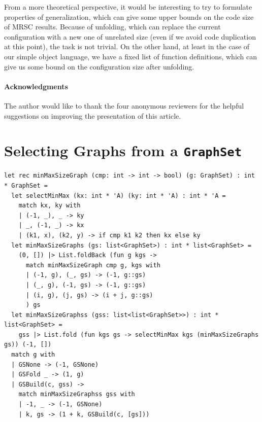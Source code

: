 \documentclass[submission,copyright,creativecommons]{eptcs}
\begin{document}
From a more theoretical perspective, it would be interesting to try to formulate properties
of generalization, which can give some upper bounds on the code size of MRSC results.
Because of unfolding, which can replace the current configuration with a new one of unrelated size (even
if we avoid code duplication at this point), the task is not trivial.
On the other hand, at least in the case of our simple object language, we have a fixed
list of function definitions, which can give us some bound on the configuration size
after unfolding.

\paragraph{Acknowledgments}
The author would like to thank the four anonymous reviewers for
the helpful suggestions on improving the presentation of
this article.





\ifVptVer
\else

\appendix

\clearpage
\section{Selecting Graphs from a \texttt{GraphSet}}\label{app:FilterGraphSet}

\begin{lstlisting}[caption={Selecting a Graph of Minimum/Maximum Size from a Graph Set}]
let rec minMaxSizeGraph (cmp: int -> int -> bool) (g: GraphSet) : int * GraphSet =
  let selectMinMax (kx: int * 'A) (ky: int * 'A) : int * 'A =
    match kx, ky with
    | (-1, _), _ -> ky
    | _, (-1, _) -> kx
    | (k1, x), (k2, y) -> if cmp k1 k2 then kx else ky
  let minMaxSizeGraphs (gs: list<GraphSet>) : int * list<GraphSet> =
    (0, []) |> List.foldBack (fun g kgs -> 
      match minMaxSizeGraph cmp g, kgs with
      | (-1, g), (_, gs) -> (-1, g::gs)
      | (_, g), (-1, gs) -> (-1, g::gs)
      | (i, g), (j, gs) -> (i + j, g::gs)
      ) gs
  let minMaxSizeGraphss (gss: list<list<GraphSet>>) : int * list<GraphSet> =
    gss |> List.fold (fun kgs gs -> selectMinMax kgs (minMaxSizeGraphs gs)) (-1, [])
  match g with
  | GSNone -> (-1, GSNone)
  | GSFold _ -> (1, g)
  | GSBuild(c, gss) -> 
    match minMaxSizeGraphss gss with
    | -1, _ -> (-1, GSNone)
    | k, gs -> (1 + k, GSBuild(c, [gs]))
\end{lstlisting}
\end{document}
